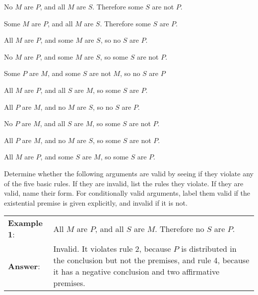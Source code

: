 \begin{exercises}

\item No $M$ are $P$, and all $M$ are $S$. Therefore some $S$ are not $P$.

\item Some $M$ are $P$, and all $M$ are $S$. Therefore some $S$ are $P$.

\item All $M$ are $P$, and some $M$ are $S$, so no $S$ are $P$.


\item No $M$ are $P$, and some $M$ are $S$, so some $S$ are not $P$.


\item Some $P$ are $M$, and some $S$ are not $M$, so no $S$ are $P$

\item All $M$ are $P$, and all $S$ are $M$, so some $S$ are $P$.

\item All $P$ are $M$, and no $M$ are $S$, so no $S$ are $P$.

\item No $P$ are $M$, and all $S$ are $M$, so some $S$ are not $P$.

\item All $P$ are $M$, and no $M$ are $S$, so some $S$ are not $P$.

\item All $M$ are $P$, and some $S$ are $M$, so some $S$ are $P$.

\end{exercises}



\practiceproblems
\noindent \problempart Determine whether the following arguments are valid by seeing if they violate any of the five basic rules. If they are invalid, list the rules they violate. If they are valid, name their form. For conditionally valid arguments, label them valid if the existential premise is given explicitly, and invalid if it is not.

\begin{longtabu}{p{.15\linewidth}p{.9\linewidth}}
\textbf{Example 1}: &All $M$ are $P$, and all $S$ are $M$. Therefore no $S$ are $P$.\\
\textbf{Answer}: & Invalid. It violates rule 2, because $P$ is distributed in the conclusion but not the premises, and rule 4, because it has a negative conclusion and two affirmative premises.\\
\end{longtabu}

